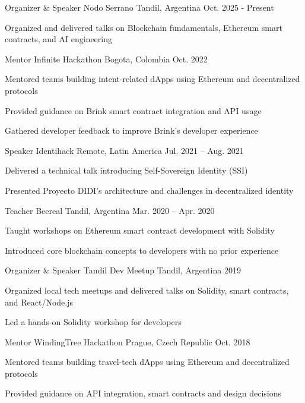 
\begin{cventries}

\cventry
{Organizer \& Speaker} %
{Nodo Serrano} %
{Tandil, Argentina} %
{Oct. 2025 - Present}
{
\begin{cvitems}
\item {Organized and delivered talks on Blockchain fundamentals, Ethereum smart contracts, and AI engineering}
\end{cvitems}
}

\cventry
{Mentor} %
{Infinite Hackathon} %
{Bogota, Colombia} %
{Oct. 2022}
{
\begin{cvitems}
\item {Mentored teams building intent-related dApps using Ethereum and decentralized protocols}
\item {Provided guidance on Brink smart contract integration and API usage}
\item {Gathered developer feedback to improve Brink's developer experience}
\end{cvitems}
}

\cventry
{Speaker} %
{Identihack} %
{Remote, Latin America} %
{Jul. 2021 – Aug. 2021}
{
\begin{cvitems}
\item {Delivered a technical talk introducing Self-Sovereign Identity (SSI)}
\item {Presented Proyecto DIDI's architecture and challenges in decentralized identity}
\end{cvitems}
}

\cventry
{Teacher} %
{Beereal} %
{Tandil, Argentina} %
{Mar. 2020 – Apr. 2020}
{
\begin{cvitems}
\item {Taught workshops on Ethereum smart contract development with Solidity}
\item {Introduced core blockchain concepts to developers with no prior experience}
\end{cvitems}
}

\cventry
{Organizer \& Speaker} %
{Tandil Dev Meetup} %
{Tandil, Argentina} %
{2019}
{
\begin{cvitems}
\item {Organized local tech meetups and delivered talks on Solidity, smart contracts, and React/Node.js}
\item {Led a hands-on Solidity workshop for developers}
\end{cvitems}
}

\cventry
{Mentor} %
{WindingTree Hackathon} %
{Prague, Czech Republic} %
{Oct. 2018}
{
\begin{cvitems}
\item {Mentored teams building travel-tech dApps using Ethereum and decentralized protocols}
\item {Provided guidance on API integration, smart contracts and design decisions}
\end{cvitems}
}

\end{cventries}
